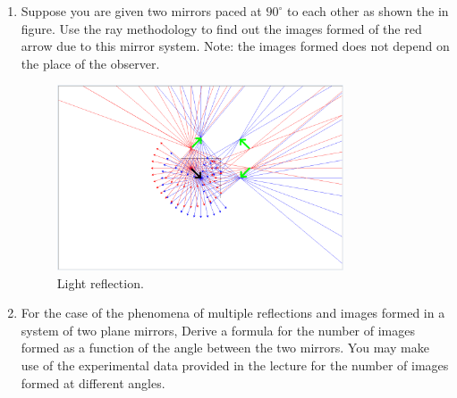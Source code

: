 \documentclass{zc-ust-hw}
\begin{document}
\maketitle

\begin{enumerate}
  \item Suppose you are given two mirrors paced at $90^\circ$ to each other as shown
    the in figure. Use the ray methodology to find out the images formed of the
    red arrow due to this mirror system. Note: the images formed does not
    depend on the place of the observer.

    \begin{figure}[htpb]
      \centering
      \includegraphics[width=0.8\textwidth]{figures/light-reflection.png}
      \caption{Light reflection.}
      \label{fig:light-reflection-png}
    \end{figure}

    \newpage

  \item For the case of the phenomena of multiple reflections and images formed
    in a system of two plane mirrors, Derive a formula for the number of images
    formed as a function of the angle between the two mirrors. You may make use
    of the experimental data provided in the lecture for the number of images
    formed at different angles.


\end{enumerate}
\end{document}
